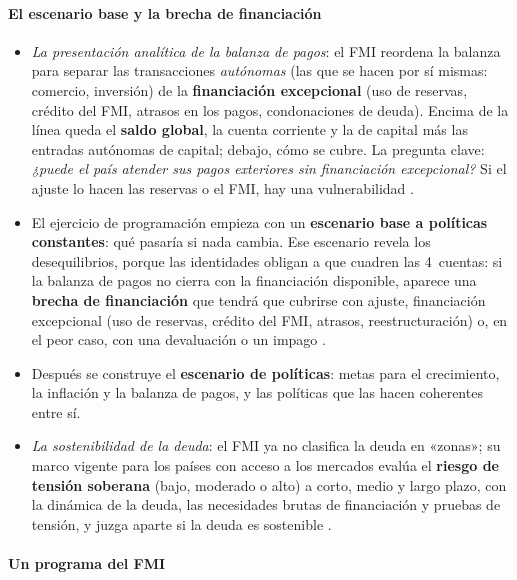 \documentclass[11pt]{article}
\begin{document}
\paragraph{El escenario base y la brecha de financiación}
\begin{itemize}
\item \emph{La presentación analítica de la balanza de pagos}: el FMI reordena la balanza para separar las transacciones \emph{autónomas} (las que se hacen por sí mismas: comercio, inversión) de la \textbf{financiación excepcional} (uso de reservas, crédito del FMI, atrasos en los pagos, condonaciones de deuda). Encima de la línea queda el \textbf{saldo global}, la cuenta corriente y la de capital más las entradas autónomas de capital; debajo, cómo se cubre. La pregunta clave: \emph{¿puede el país atender sus pagos exteriores sin financiación excepcional?} Si el ajuste lo hacen las reservas o el FMI, hay una vulnerabilidad \parencite{FMI2009MBP6}.
\item El ejercicio de programación empieza con un \textbf{escenario base a políticas constantes}: qué pasaría si nada cambia. Ese escenario revela los desequilibrios, porque las identidades obligan a que cuadren las 4~cuentas: si la balanza de pagos no cierra con la financiación disponible, aparece una \textbf{brecha de financiación} que tendrá que cubrirse con ajuste, financiación excepcional (uso de reservas, crédito del FMI, atrasos, reestructuración) o, en el peor caso, con una devaluación o un impago \parencite{FMI2013CaseStudy,FMI2009MBP6}.
\item Después se construye el \textbf{escenario de políticas}: metas para el crecimiento, la inflación y la balanza de pagos, y las políticas que las hacen coherentes entre sí.
\item \emph{La sostenibilidad de la deuda}: el FMI ya no clasifica la deuda en «zonas»; su marco vigente para los países con acceso a los mercados evalúa el \textbf{riesgo de tensión soberana} (bajo, moderado o alto) a corto, medio y largo plazo, con la dinámica de la deuda, las necesidades brutas de financiación y pruebas de tensión, y juzga aparte si la deuda es sostenible \parencite{FMI2021DSA}.
\end{itemize}

\paragraph{Un programa del FMI}\label{anexo:programa-fmi}
\end{document}
